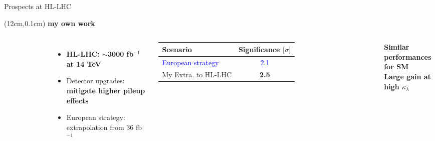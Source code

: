 \begin{frame}{Prospects at HL-LHC}
\begin{textblock*}{5cm}(12cm,0.1cm) %
   \textcolor{HHred}{\Large\textbf{my own work}}
\end{textblock*}
\begin{columns}

\begin{figure}
  \centering
\end{figure}


\begin{itemize}
    \item \textbf{HL-LHC: \textcolor{HHturquoise_d}{$\sim$3000 fb$^{-1}$} at \textcolor{HHturquoise_d}{14 TeV}}
    \item Detector upgrades: \textbf{mitigate higher pileup effects} 
    \item European strategy: extrapolation from 36 fb$^{-1}$
\end{itemize}

\begin{table}[]
    \centering
    \begin{tabular}{lc}
        \hline\hline
        Scenario & Significance [$\sigma$]  \\
        \hline
        \textcolor{blue}{European strategy} & \textcolor{blue}{2.1} \\
        My Extra. to HL-LHC & \textbf{2.5} \\
        \hline\hline
    \end{tabular}
\end{table}

\begin{center}
    \textbf{\textcolor{HHturquoise_d}{Similar performances for SM} } \\
    \textbf{\textcolor{HHred}{Large gain at high $\kappa_{\lambda}$}}
\end{center}

\end{columns}  
\end{frame}